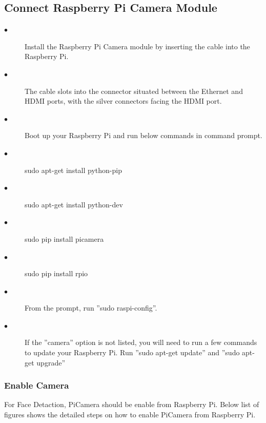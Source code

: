\documentclass[sigconf]{acmart}
\begin{document}
\subsection{Connect Raspberry Pi Camera Module}
\begin{description}
    \item[$\bullet$] Install the Raspberry Pi Camera module by inserting the cable into the Raspberry Pi.
    \item[$\bullet$] The cable slots into the connector situated between the Ethernet and HDMI ports, with the silver connectors facing the HDMI port.
    \item[$\bullet$] Boot up your Raspberry Pi and run below commands in command prompt.
    \item[$\bullet$] sudo apt-get install python-pip
    \item[$\bullet$] sudo apt-get install python-dev
    \item[$\bullet$] sudo pip install picamera
    \item[$\bullet$] sudo pip install rpio
    \item[$\bullet$] From the prompt, run ''sudo raspi-config''. 
    \item[$\bullet$] If the ''camera'' option is not listed, you will need to run a few commands to update your Raspberry Pi. Run ''sudo apt-get update'' and ''sudo apt-get upgrade''
\end{description}
\subsubsection{Enable Camera}
For Face Detaction, PiCamera should be enable from Raspberry Pi. Below list of figures shows the detailed steps on how to enable PiCamera from Raspberry Pi.
\end{document}
